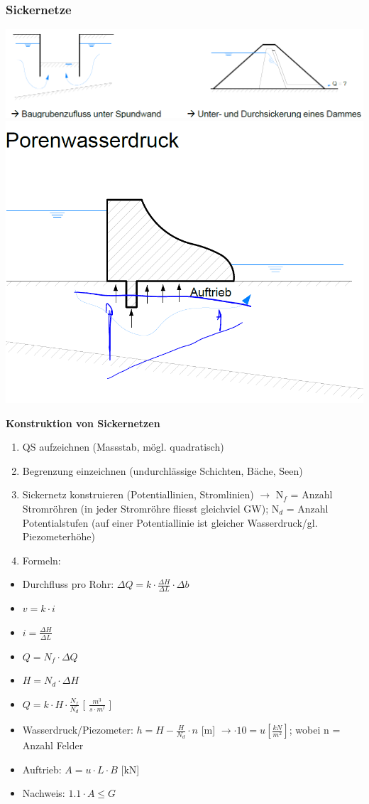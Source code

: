 
	\begin{minipage}{\linewidth}
		
		\subsubsection{Sickernetze}
		
		\includegraphics[width=0.6\linewidth]{images/GW15Sickerwassermenge.PNG}
		\includegraphics[width=0.2\linewidth]{images/GW16Porenwasserdruck.PNG}		\\
	\end{minipage}
\begin{minipage}{0.5\linewidth}
		
		\textbf{Konstruktion von Sickernetzen}
		\begin{enumerate}
			\item QS aufzeichnen (Massstab, mögl. quadratisch)
			\item Begrenzung einzeichnen (undurchlässige Schichten, Bäche, Seen)
			\item Sickernetz konstruieren (Potentiallinien, Stromlinien)
					$ \rightarrow $ N$_f$ = Anzahl Stromröhren (in jeder Stromröhre fliesst gleichviel GW); N$_d$ = Anzahl Potentialstufen (auf einer Potentiallinie ist gleicher Wasserdruck/gl. Piezometerhöhe)
			\item Formeln:			
		\end{enumerate}
		\begin{itemize}
			\item Durchfluss pro Rohr: $ \Delta Q = k \cdot \frac{\Delta H}{\Delta L} \cdot \Delta b $
			\item $ v = k \cdot i $
			\item $ i = \frac{\Delta H}{\Delta L} $
			\item $ Q = N_f \cdot \Delta Q $
			\item $ H = N_d \cdot \Delta H $
			\item $ Q = k \cdot H \cdot \frac{N_f}{N_d} $ [ $ \frac{m^3}{s \cdot m^l} $ ]
			\item Wasserdruck/Piezometer: $ h = H - \frac{H}{N_d} \cdot n $ [m] $ \rightarrow \cdot 10 = u [\frac{kN}{m^2}] $; wobei n = Anzahl Felder
			\item Auftrieb: $ A = u \cdot L \cdot B $ [kN]
			\item Nachweis: $ 1.1 \cdot A \leq G $
		\end{itemize}
	
\end{minipage}
